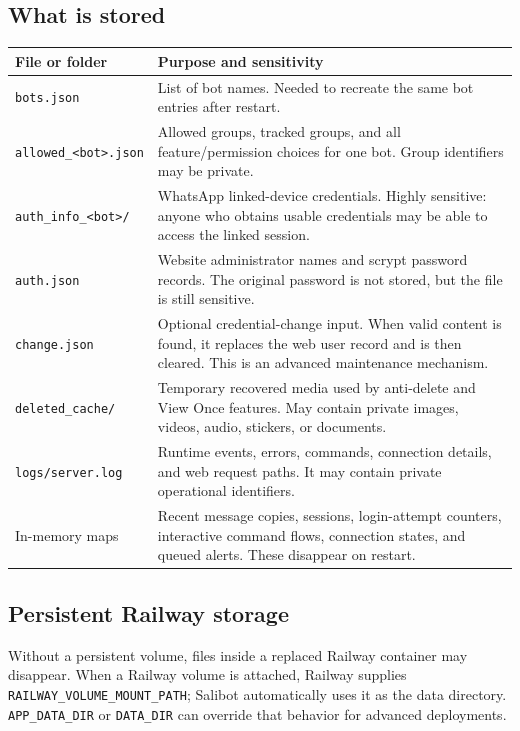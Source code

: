 \documentclass[11pt,a4paper]{article}
\begin{document}
\subsection{What is stored}

\begin{longtable}{p{}p{}}
\toprule
\textbf{File or folder} & \textbf{Purpose and sensitivity}\\
\midrule
\endhead
\texttt{bots.json} & List of bot names. Needed to recreate the same bot entries after restart.\\
\texttt{allowed\_<bot>.json} & Allowed groups, tracked groups, and all feature/permission choices for one bot. Group identifiers may be private.\\
\texttt{auth\_info\_<bot>/} & WhatsApp linked-device credentials. Highly sensitive: anyone who obtains usable credentials may be able to access the linked session.\\
\texttt{auth.json} & Website administrator names and scrypt password records. The original password is not stored, but the file is still sensitive.\\
\texttt{change.json} & Optional credential-change input. When valid content is found, it replaces the web user record and is then cleared. This is an advanced maintenance mechanism.\\
\texttt{deleted\_cache/} & Temporary recovered media used by anti-delete and View Once features. May contain private images, videos, audio, stickers, or documents.\\
\texttt{logs/server.log} & Runtime events, errors, commands, connection details, and web request paths. It may contain private operational identifiers.\\
In-memory maps & Recent message copies, sessions, login-attempt counters, interactive command flows, connection states, and queued alerts. These disappear on restart.\\
\bottomrule
\end{longtable}

\subsection{Persistent Railway storage}

Without a persistent volume, files inside a replaced Railway container may disappear. When a Railway volume is attached, Railway supplies \texttt{RAILWAY\_VOLUME\_MOUNT\_PATH}; Salibot automatically uses it as the data directory. \texttt{APP\_DATA\_DIR} or \texttt{DATA\_DIR} can override that behavior for advanced deployments.
\end{document}
